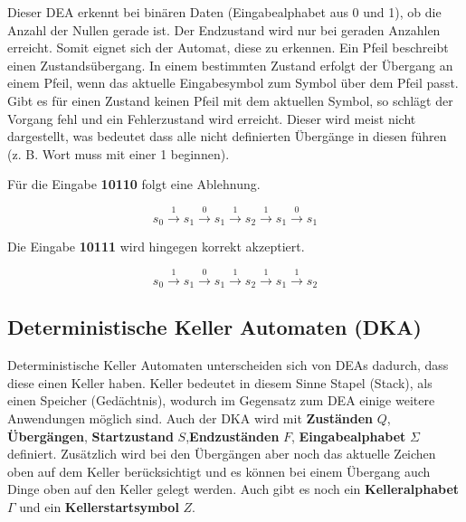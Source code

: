 Dieser DEA erkennt bei binären Daten (Eingabealphabet aus 0 und 1), ob die Anzahl
der Nullen gerade ist. Der Endzustand wird nur bei geraden Anzahlen erreicht.
Somit eignet sich der Automat, diese zu erkennen.
Ein Pfeil beschreibt einen Zustandsübergang. In einem bestimmten Zustand erfolgt
der Übergang an einem Pfeil, wenn das aktuelle Eingabesymbol zum Symbol über dem Pfeil passt.
Gibt es für einen Zustand keinen Pfeil mit dem aktuellen Symbol, so schlägt der Vorgang
fehl und ein Fehlerzustand wird erreicht. Dieser wird meist nicht dargestellt, was bedeutet
dass alle nicht definierten Übergänge in diesen führen (z. B. Wort muss mit einer 1 beginnen).

\clearpage

Für die Eingabe \textbf{10110} folgt eine Ablehnung.

\Large
\begin{equation*}
    s_0 \overset{1}{\rightarrow} s_1 \overset{0}{\rightarrow} s_1 \overset{1}{\rightarrow}
    s_2 \overset{1}{\rightarrow} s_1 \overset{0}{\rightarrow} s_1 
\end{equation*}
\normalsize

Die Eingabe \textbf{10111} wird hingegen korrekt akzeptiert.

\vspace*{-0.9cm}

\Large
\begin{equation*}
    s_0 \overset{1}{\rightarrow} s_1 \overset{0}{\rightarrow} s_1 \overset{1}{\rightarrow}
    s_2 \overset{1}{\rightarrow} s_1 \overset{1}{\rightarrow} s_2 
\end{equation*}
\normalsize

\clearpage

\subsection{Deterministische Keller Automaten (DKA)}

Deterministische Keller Automaten unterscheiden sich von DEAs dadurch,
dass diese einen Keller haben. Keller bedeutet in diesem Sinne Stapel (Stack),
als einen Speicher (Gedächtnis), wodurch im Gegensatz zum DEA einige
weitere Anwendungen möglich sind.
Auch der DKA wird mit \textbf{Zuständen} $Q$, \textbf{Übergängen},
\textbf{Startzustand} $S$,\textbf{Endzuständen} $F$, \textbf{Eingabealphabet} $\Sigma$
definiert. Zusätzlich wird bei den Übergängen aber noch das aktuelle Zeichen oben auf
dem Keller berücksichtigt und es können bei einem Übergang auch Dinge oben auf den Keller
gelegt werden. Auch gibt es noch ein \textbf{Kelleralphabet} $\Gamma$ und ein
\textbf{Kellerstartsymbol} $Z$.

